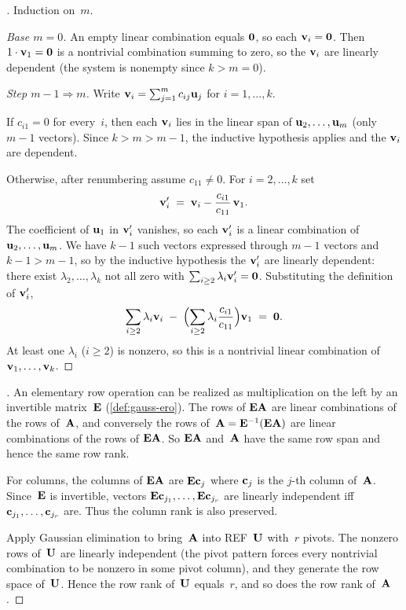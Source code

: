\begin{proof}[]
Induction on~$m$.

\emph{Base $m = 0$.} An empty linear combination equals $\mathbf{0}$, so
each $\mathbf{v}_i = \mathbf{0}$. Then $1 \cdot \mathbf{v}_1 = \mathbf{0}$ is
a nontrivial combination summing to zero, so the $\mathbf{v}_i$ are
linearly dependent (the system is nonempty since $k > m = 0$).

\emph{Step $m - 1 \Rightarrow m$.} Write
$\mathbf{v}_i = \sum_{j=1}^{m} c_{ij} \mathbf{u}_j$ for $i = 1, \dots, k$.

If $c_{i1} = 0$ for every~$i$, then each $\mathbf{v}_i$ lies in the linear
span of $\mathbf{u}_2, \dots, \mathbf{u}_m$ (only $m - 1$ vectors). Since
$k > m > m - 1$, the inductive hypothesis applies and the $\mathbf{v}_i$
are dependent.

Otherwise, after renumbering assume $c_{11} \neq 0$. For $i = 2, \dots, k$
set
\[
  \mathbf{v}'_i \;=\; \mathbf{v}_i - \frac{c_{i1}}{c_{11}}\,\mathbf{v}_1.
\]
The coefficient of $\mathbf{u}_1$ in $\mathbf{v}'_i$ vanishes, so each
$\mathbf{v}'_i$ is a linear combination of $\mathbf{u}_2, \dots, \mathbf{u}_m$.
We have $k - 1$ such vectors expressed through $m - 1$ vectors and
$k - 1 > m - 1$, so by the inductive hypothesis the $\mathbf{v}'_i$ are
linearly dependent: there exist $\lambda_2, \dots, \lambda_k$ not all
zero with $\sum_{i \ge 2} \lambda_i \mathbf{v}'_i = \mathbf{0}$. Substituting
the definition of $\mathbf{v}'_i$,
\[
  \sum_{i \ge 2} \lambda_i \mathbf{v}_i
  \;-\; \Bigl(\sum_{i \ge 2} \lambda_i \frac{c_{i1}}{c_{11}}\Bigr) \mathbf{v}_1
  \;=\; \mathbf{0}.
\]
At least one $\lambda_i$ ($i \ge 2$) is nonzero, so this is a
nontrivial linear combination of $\mathbf{v}_1, \dots, \mathbf{v}_k$.
\end{proof}

\begin{proof}[]
An elementary row operation can be realized as multiplication on the
left by an invertible matrix~$\mathbf{E}$ (\cref{def:gauss-ero}). The rows
of $\mathbf{E}\mathbf{A}$ are linear combinations of the rows of~$\mathbf{A}$,
and conversely the rows of~$\mathbf{A} = \mathbf{E}^{-1}(\mathbf{E}\mathbf{A})$ are
linear combinations of the rows of $\mathbf{E}\mathbf{A}$. So $\mathbf{E}\mathbf{A}$
and~$\mathbf{A}$ have the same row span and hence the same row rank.

For columns, the columns of $\mathbf{E}\mathbf{A}$ are
$\mathbf{E} \mathbf{c}_j$ where $\mathbf{c}_j$ is the $j$-th column of~$\mathbf{A}$.
Since~$\mathbf{E}$ is invertible, vectors $\mathbf{E}\mathbf{c}_{j_1}, \dots,
\mathbf{E}\mathbf{c}_{j_r}$ are linearly independent iff
$\mathbf{c}_{j_1}, \dots, \mathbf{c}_{j_r}$ are. Thus the column rank is
also preserved.

Apply Gaussian elimination to bring~$\mathbf{A}$ into REF~$\mathbf{U}$ with~$r$
pivots. The nonzero rows of~$\mathbf{U}$ are linearly independent (the
pivot pattern forces every nontrivial combination to be nonzero in some
pivot column), and they generate the row space of~$\mathbf{U}$. Hence the
row rank of~$\mathbf{U}$ equals~$r$, and so does the row rank of~$\mathbf{A}$.
\end{proof}

